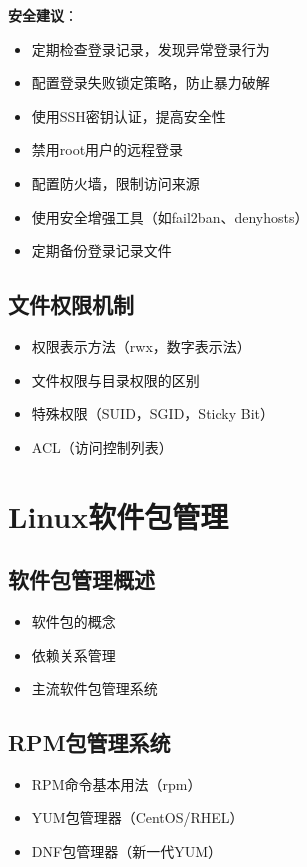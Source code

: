 \documentclass[12pt,UTF8]{ctexbook}
\begin{document}
\textbf{安全建议}：
\begin{itemize}
    \item 定期检查登录记录，发现异常登录行为
    \item 配置登录失败锁定策略，防止暴力破解
    \item 使用SSH密钥认证，提高安全性
    \item 禁用root用户的远程登录
    \item 配置防火墙，限制访问来源
    \item 使用安全增强工具（如fail2ban、denyhosts）
    \item 定期备份登录记录文件
\end{itemize}

\section{文件权限机制}
\begin{itemize}
    \item 权限表示方法（rwx，数字表示法）
    \item 文件权限与目录权限的区别
    \item 特殊权限（SUID，SGID，Sticky Bit）
    \item ACL（访问控制列表）
\end{itemize}

\chapter{Linux软件包管理}

\section{软件包管理概述}
\begin{itemize}
    \item 软件包的概念
    \item 依赖关系管理
    \item 主流软件包管理系统
\end{itemize}

\section{RPM包管理系统}
\begin{itemize}
    \item RPM命令基本用法（rpm）
    \item YUM包管理器（CentOS/RHEL）
    \item DNF包管理器（新一代YUM）
\end{itemize}
\end{document}
